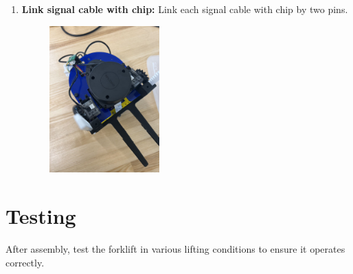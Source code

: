 \documentclass{article}
\begin{document}
\begin{enumerate}[label=Step \arabic*:,leftmargin=*,align=left]
    \item \textbf{Link signal cable with chip:}
    Link each signal cable with chip by two pins.
    \begin{figure}[H]
        \centering
        \includegraphics[width=0.40\textwidth]{9.jpg}
        \captionsetup{justification=centering}
        \caption{}
    \end{figure}  

   
\end{enumerate}

\section{Testing}
After assembly, test the forklift in various lifting conditions to ensure it operates correctly.
\end{document}

